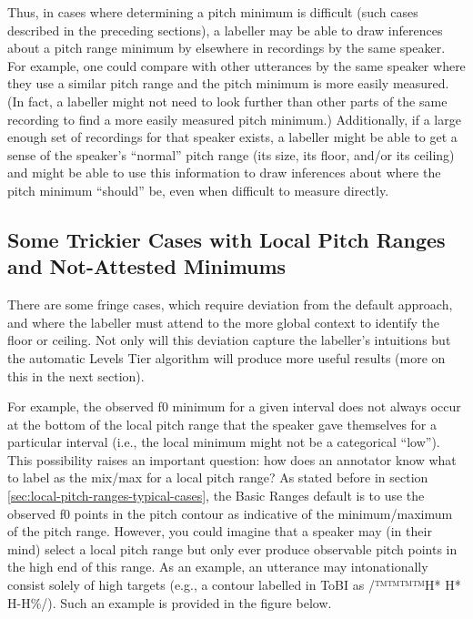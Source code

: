 \documentclass[11pt, twoside]{memoir}
\begin{document}
Thus, in cases where determining a pitch minimum is difficult (such cases described in the preceding sections), a labeller may be able to draw inferences about a pitch range minimum by elsewhere in recordings by the same speaker. For example, one could compare with other utterances by the same speaker where they use a similar pitch range and the pitch minimum is more easily measured. (In fact, a labeller might not need to look further than other parts of the same recording to find a more easily measured pitch minimum.) Additionally, if a large enough set of recordings for that speaker exists, a labeller might be able to get a sense of the speaker’s “normal” pitch range (its size, its floor, and/or its ceiling) and might be able to use this information to draw inferences about where the pitch minimum “should” be, even when difficult to measure directly.

\subsection{Some Trickier Cases with Local Pitch Ranges and Not-Attested Minimums}\label{sec:some-trickier-cases-with-local-pitch-ranges}

There are some fringe cases, which require deviation from the default approach, and where the labeller must attend to the more global context to identify the floor or ceiling. Not only will this deviation capture the labeller’s intuitions but the automatic Levels Tier algorithm will produce more useful results (more on this in the next section).

For example, the observed f0 minimum for a given interval does not always occur at the bottom of the local pitch range that the speaker gave themselves for a particular interval (i.e., the local minimum might not be a categorical “low”). This possibility raises an important question: how does an annotator know what to label as the mix\slash max for a local pitch range? As stated before in section \ref{sec:local-pitch-ranges-typical-cases}, the Basic Ranges default is to use the observed f0 points in the pitch contour as indicative of the minimum\slash maximum of the pitch range. However, you could imagine that a speaker may (in their mind) select a local pitch range but only ever produce observable pitch points in the high end of this range. As an example, an utterance may intonationally consist solely of high targets (e.g., a contour labelled in ToBI as /™™™™{H* H* H-H\%}/). Such an example is provided in the figure below.
\end{document}
